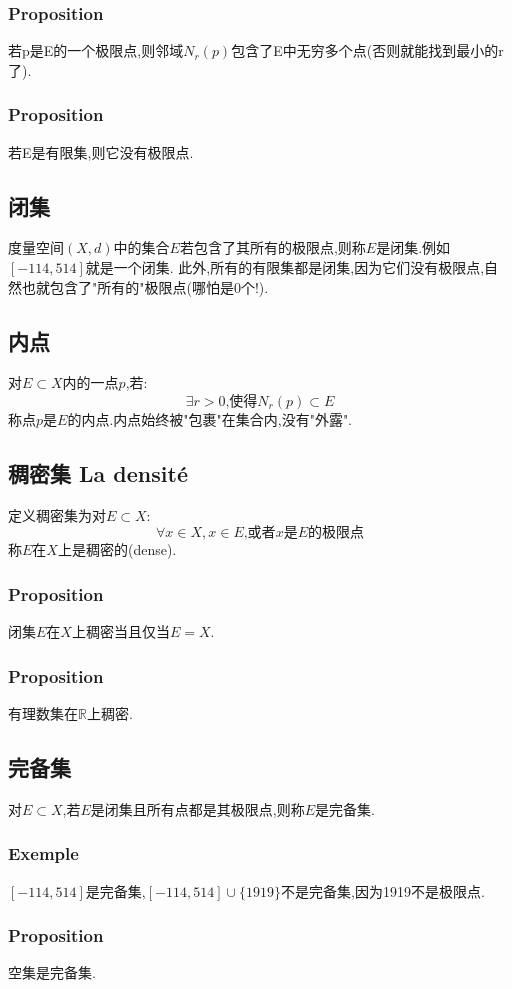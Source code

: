 \documentclass[12pt, a4paper, oneside]{ctexbook}
\newcommand{\R }{\mathbb{R}}%
\begin{document}
  \subsubsection{Proposition}
  若p是E的一个极限点,则邻域$N_r(p)$包含了E中无穷多个点(否则就能找到最小的r了).
  \subsubsection{Proposition}
  若E是有限集,则它没有极限点.
  \subsection{闭集}
  度量空间$(X,d)$中的集合$E$若包含了其所有的极限点,则称$E$是闭集.例如$[-114,514]$就是一个闭集.
  此外,所有的有限集都是闭集,因为它们没有极限点,自然也就包含了"所有的"极限点(哪怕是0个!).
  \subsection{内点}
  对$E\subset X$内的一点$p$,若:
  $$
    \exists r>0\mbox{,使得}N_r(p)\subset E
  $$称点$p$是$E$的内点.内点始终被"包裹"在集合内,没有"外露".

  \subsection{稠密集 La densité}
  定义稠密集为对$E\subset X$:
  $$
  \forall x\in X, x\in E\text{,或者}x{是}E{的极限点}
  $$
  称$E$在$X$上是稠密的(dense).
  \subsubsection{Proposition}
  闭集$E$在$X$上稠密当且仅当$E=X$.
  \subsubsection{Proposition}
  有理数集在$\R$上稠密.

  \subsection{完备集}
  对$E\subset X$,若$E$是闭集且所有点都是其极限点,则称$E$是完备集.
  \subsubsection{Exemple}
  $[-114,514]$是完备集,$[-114,514]\cup\{1919\}$不是完备集,因为1919不是极限点.
  \subsubsection{Proposition}
  空集是完备集.
\end{document}
